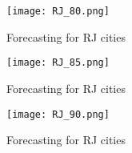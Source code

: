  \begin{figure}[!ht] 
 \centering 
 \texttt{[image: RJ\_80.png]} 
 \caption{Forecasting for RJ cities } 
 \label{fig:RJ_80} 
 \end{figure} 
 
 \begin{figure}[!ht] 
 \centering 
 \texttt{[image: RJ\_85.png]} 
 \caption{Forecasting for RJ cities } 
 \label{fig:RJ_85} 
 \end{figure} 
 
 \begin{figure}[!ht] 
 \centering 
 \texttt{[image: RJ\_90.png]} 
 \caption{Forecasting for RJ cities } 
 \label{fig:RJ_90} 
 \end{figure} 
 
